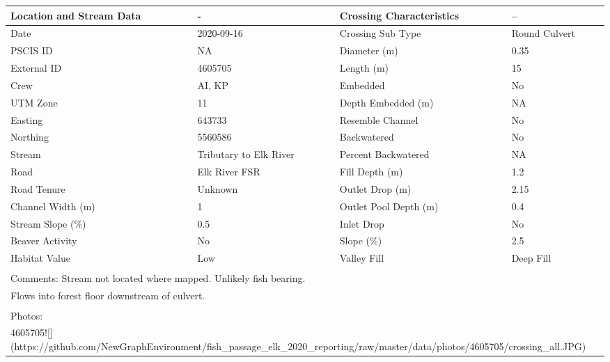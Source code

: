 \documentclass[
]{book}
\begin{document}
\begin{tabular}{l|l|l|l}
\hline
Location and Stream Data & - & Crossing Characteristics & --\\
\hline
Date & 2020-09-16 & Crossing Sub Type & Round Culvert\\
\hline
PSCIS ID & NA & Diameter (m) & 0.35\\
\hline
External ID & 4605705 & Length (m) & 15\\
\hline
Crew & AI, KP & Embedded & No\\
\hline
UTM Zone & 11 & Depth Embedded (m) & NA\\
\hline
Easting & 643733 & Resemble Channel & No\\
\hline
Northing & 5560586 & Backwatered & No\\
\hline
Stream & Tributary to Elk River & Percent Backwatered & NA\\
\hline
Road & Elk River FSR & Fill Depth (m) & 1.2\\
\hline
Road Tenure & Unknown & Outlet Drop (m) & 2.15\\
\hline
Channel Width (m) & 1 & Outlet Pool Depth (m) & 0.4\\
\hline
Stream Slope (\%) & 0.5 & Inlet Drop & No\\
\hline
Beaver Activity & No & Slope (\%) & 2.5\\
\hline
Habitat Value & Low & Valley Fill & Deep Fill\\
\hline
\multicolumn{4}{l}{\textsuperscript{} Comments: Stream not located where mapped. Unlikely fish bearing.}\\
\multicolumn{4}{l}{Flows into forest floor downstream of culvert.}\\
\multicolumn{4}{l}{\textsuperscript{} Photos:}\\
\multicolumn{4}{l}{4605705![](https://github.com/NewGraphEnvironment/fish\_passage\_elk\_2020\_reporting/raw/master/data/photos/4605705/crossing\_all.JPG)}\\
\end{tabular}
\end{document}
